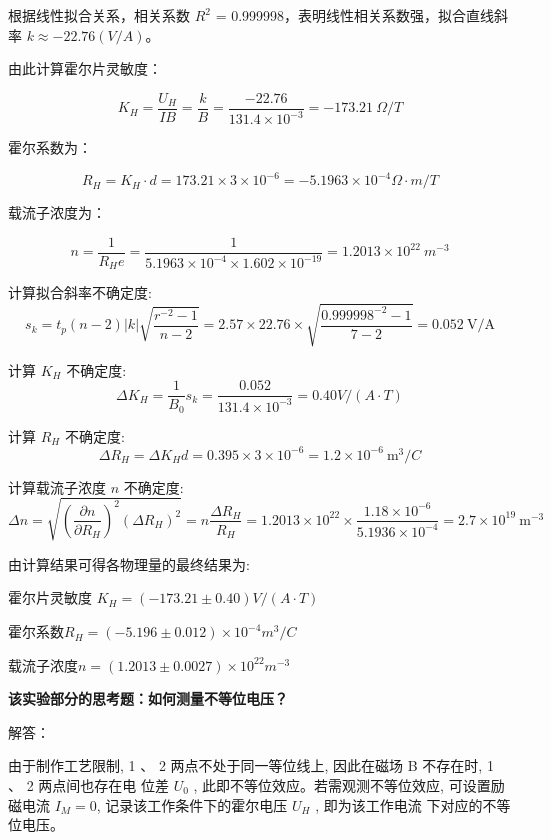 \documentclass[UTF8]{ctexart}
\begin{document}
根据线性拟合关系，相关系数 $R^2$ = 0.999998，表明线性相关系数强，拟合直线斜率 $k \approx -22.76(V/A)$。

由此计算霍尔片灵敏度：

$$
K_H = \frac{U_H}{IB}= \frac{k}{B} = \frac{-22.76}{131.4\times10^{-3}} = -173.21~\Omega/T
$$

霍尔系数为：

$$
R_H = K_H \cdot d = 173.21\times 3 \times10^{-6} = -5.1963\times10^{-4}\Omega\cdot m/T
$$

载流子浓度为：

$$
n = \frac{1}{R_He} = \frac{1}{5.1963\times10^{-4}\times 1.602\times10^{-19}} = 1.2013\times10^{22}~m^{-3}
$$

计算拟合斜率不确定度:
$$
s_{k}=t_{p}(n-2)|k| \sqrt{\frac{r^{-2}-1}{n-2}}=2.57 \times 22.76 \times \sqrt{\frac{0.999998^{-2}-1}{7-2}}=0.052 \mathrm{~V} / \mathrm{A}
$$

计算  $K_{H} $ 不确定度:
$$
\Delta K_{H}=\frac{1}{B_{0}} s_{k}=\frac{0.052}{131.4 \times 10^{-3}}=0.40 V /(A \cdot T)$$

计算  $R_{H}$  不确定度:
$$
\Delta R_{H}=\Delta K_{H} d=0.395 \times 3 \times 10^{-6}=1.2 \times 10^{-6} \mathrm{~m}^{3} / C
$$

计算载流子浓度  $n $ 不确定度:
$$
\Delta n=\sqrt{\left(\frac{\partial n}{\partial R_{H}}\right)^{2}\left(\Delta R_{H}\right)^{2}}=n \frac{\Delta R_{H}}{R_{H}}=1.2013 \times 10^{22} \times \frac{1.18 \times 10^{-6}}{5.1936 \times 10^{-4}}=2.7 \times 10^{19} \mathrm{~m}^{-3}
$$

由计算结果可得各物理量的最终结果为:
\begin{center}
  霍尔片灵敏度 $K_{H}=(-173.21 \pm 0.40) V /(A \cdot T)$
\end{center}
\begin{center}
  霍尔系数$R_{H}=(-5.196 \pm 0.012) \times 10^{-4} m^{3} / C$
\end{center}
\begin{center}
  载流子浓度$n=(1.2013 \pm 0.0027) \times 10^{22} m^{-3}$
\end{center}

\noindent \textbf{该实验部分的思考题：如何测量不等位电压？}

\noindent 解答：

由于制作工艺限制,  1 、 2  两点不处于同一等位线上, 因此在磁场  B  不存在时,  1 、 2  两点间也存在电 位差  $U_{0}$ , 此即不等位效应。若需观测不等位效应, 可设置励磁电流  $I_{M}=0 $, 记录该工作条件下的霍尔电压  $U_{H}$ , 即为该工作电流 下对应的不等位电压。
\end{document}
